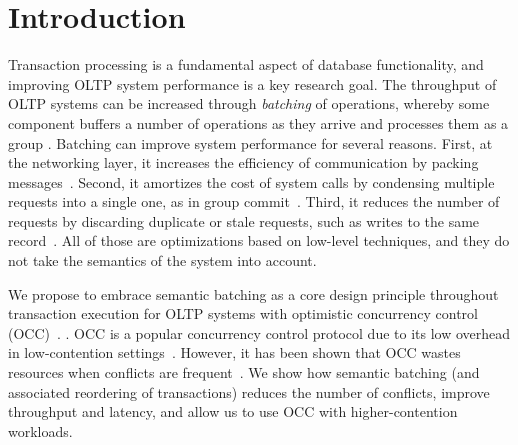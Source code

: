 \section{Introduction}\label{sec:intro}

Transaction processing is a fundamental aspect of database functionality, and improving OLTP system performance is a key research goal. The throughput of OLTP systems can be increased through \emph{batching} of operations, whereby some component buffers a number of operations as they arrive and processes them as a group \cite{friedman1997packing,debrabant2013anti,hagmann1987reimplementing}.
Batching can improve system performance for several reasons. First, at the networking layer, it increases the efficiency of communication by packing messages~\cite{ding2015centiman,friedman1997packing}. Second, it amortizes the cost of system calls by condensing multiple requests into a single one, as in group commit~\cite{debrabant2013anti,hagmann1987reimplementing}. Third, it reduces the number of requests by discarding duplicate or stale requests, such as writes to the same record~\cite{faleiro2014lazy}. All of those are optimizations based on low-level techniques, and they do not take the semantics of the system into account.

We propose to embrace semantic batching as a core design principle throughout transaction execution for OLTP systems with optimistic concurrency control (OCC)~\cite{kung81tods}. .
OCC is a popular concurrency control protocol due to its low overhead in low-contention
settings~\cite{adya97podc, baker11cidr, bernstein2015optimizing,bernstein11cidr,
bernstein11vldb, corbett12osdi,warp, patterson12vldb,peng10osdi,larson2011high}. However, it has been shown that OCC
wastes resources when conflicts are frequent~\cite{agrawal1987concurrency}. We
show how semantic batching (and associated reordering of transactions) reduces the number of conflicts, improve
throughput and latency, and allow us to use OCC with higher-contention workloads.


